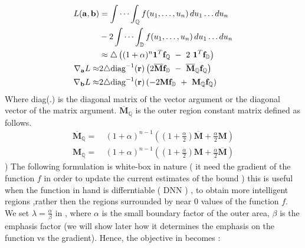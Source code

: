\begin{equation}
\begin{aligned} 
L(\mathbf{a},\mathbf{b}) &= \idotsint_\mathbb{Q} f(u_1,\dots,u_n) \,du_1 \dots du_n \\ 
&- 2 \idotsint_\mathbb{D} f(u_1,\dots,u_n) \,du_1 \dots du_n \\ 
&\approx \triangle\left((1+\alpha)^{n} \mathbf{1}^{T}\mathbf{f}_{\mathbb{Q}} ~-~ 2 ~ \mathbf{1}^{T}\mathbf{f}_{\mathbb{D}}\right)\\ 
\nabla_{\mathbf{a}}L  \approx &2\triangle\text{diag}^{-1}(\mathbf{r}) \left(2\overline{\mathbf{M}}\mathbf{f}_{\mathbb{D}} ~-~ \overline{\mathbf{M}}_{\mathbb{Q}}\mathbf{f}_{\mathbb{Q}}  \right) \\
\nabla_{\mathbf{b}}L  \approx &2\triangle\text{diag}^{-1}(\mathbf{r}) \left(-2\mathbf{M}\mathbf{f}_{\mathbb{D}} ~+~ \mathbf{M}_{\mathbb{Q}}\mathbf{f}_{\mathbb{Q}}  \right)
\label{eq:n-loss-update-outer}
\end{aligned}
\end{equation}
Where diag(.) is the diagonal matrix of the vector argument or the diagonal vector of the matrix argument. $\overline{\mathbf{M}}_{\mathbb{Q}}$ is the outer region constant matrix defined as follows. 
\begin{equation}
\begin{aligned} 
\overline{\mathbf{M}}_{\mathbb{Q}} = &~  (1+\alpha)^{n-1}\left((1+\frac{\alpha}{2})\overline{\mathbf{M}}+\frac{\alpha}{2}\mathbf{M}\right)\\ 
\mathbf{M}_{\mathbb{Q}} = &~  (1+\alpha)^{n-1}\left((1+\frac{\alpha}{2})\mathbf{M}+\frac{\alpha}{2}\overline{\mathbf{M}}\right)
\label{eq:n-mask-outer}
\end{aligned}
\end{equation}
)
 The following formulation is white-box in nature ( it need the gradient of the function $f $ in order to update the current estimates of the bound ) this is useful when the function in hand is differntiable ( \eg DNN ) , to obtain more intelligent regions  ,rather then the regions surrounded by near 0 values of the function $f$. We set $\lambda = \frac{\alpha}{\beta}$ in \eqLabel{\ref{eq:loss-oir}}, where $\alpha$ is the small boundary factor of the outer area, $\beta$ is the emphasis factor (we will show later how it determines the emphasis on the function vs the gradient). Hence, the objective in \eqLabel{\ref{eq:loss-oir}} becomes :

